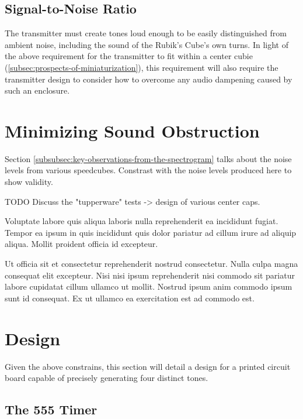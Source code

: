 \subsection{Signal-to-Noise Ratio}
\label{subsec:transmitter-signal-to-noise-ratio}

The transmitter must create tones loud enough to be easily
distinguished from ambient noise, including the sound of the Rubik's
Cube's own turns. In light of the above requirement for the transmitter
to fit within a center cubie
(\ref{subsec:prospects-of-miniaturization}), this requirement will also
require the transmitter design to consider how to overcome any audio
dampening caused by such an enclosure.


\section{Minimizing Sound Obstruction}
\label{sec:minimizing-sound-obstruction}

Section \ref{subsubsec:key-observations-from-the-spectrogram} talks
about the noise levels from various speedcubes. Constrast with the
noise levels produced here to show validity.

TODO Discuss the "tupperware" tests -> design of various center caps.

Voluptate labore quis aliqua laboris nulla reprehenderit ea incididunt
fugiat. Tempor ea ipsum in quis incididunt quis dolor pariatur ad
cillum irure ad aliquip aliqua. Mollit proident officia id excepteur.

Ut officia sit et consectetur reprehenderit nostrud consectetur. Nulla
culpa magna consequat elit excepteur. Nisi nisi ipsum reprehenderit
nisi commodo sit pariatur labore cupidatat cillum ullamco ut mollit.
Nostrud ipsum anim commodo ipsum sunt id consequat. Ex ut ullamco ea
exercitation est ad commodo est.

\section{Design}
\label{sec:transmitter-design}

Given the above constrains, this section will detail a design for a
printed circuit board capable of precisely generating four distinct
tones.

\subsection{The 555 Timer}
\label{sec:the-555-timer}

